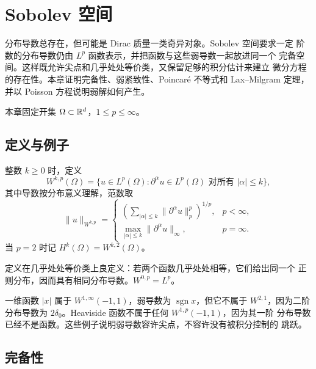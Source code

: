 \chapter{Sobolev 空间}
\label{chap:sobolev-spaces}

分布导数总存在，但可能是 Dirac 质量一类奇异对象。Sobolev 空间要求一定
阶数的分布导数仍由 \(L^p\) 函数表示，并把函数与这些弱导数一起放进同一个
完备空间。这样既允许尖点和几乎处处等价类，又保留足够的积分估计来建立
微分方程的存在性。本章证明完备性、弱紧致性、Poincaré 不等式和
Lax--Milgram 定理，并以 Poisson 方程说明弱解如何产生。

本章固定开集 \(\Omega\subset\mathbb{R}^d\)，\(1\le p\le\infty\)。

\section{定义与例子}

\begin{definition}
整数 \(k\ge0\) 时，定义
\[
 W^{k,p}(\Omega)=
 \{u\in L^p(\Omega):\partial^\alpha u\in L^p(\Omega)
 \text{ 对所有 }|\alpha|\le k\},
\]
其中导数按分布意义理解，范数取
\[
 \|u\|_{W^{k,p}}=
 \begin{cases}
 \left(\displaystyle\sum_{|\alpha|\le k}
 \|\partial^\alpha u\|_p^p\right)^{1/p},&p<\infty,\\[1ex]
 \displaystyle\max_{|\alpha|\le k}\|\partial^\alpha u\|_\infty,&p=\infty.
 \end{cases}
\]
当 \(p=2\) 时记 \(H^k(\Omega)=W^{k,2}(\Omega)\)。
\end{definition}

定义在几乎处处等价类上良定义：若两个函数几乎处处相等，它们给出同一个
正则分布，因而具有相同分布导数。\(W^{0,p}=L^p\)。

一维函数 \(|x|\) 属于 \(W^{1,\infty}(-1,1)\)，弱导数为
\(\operatorname{sgn}x\)，但它不属于 \(W^{2,1}\)，因为二阶分布导数为
\(2\delta_0\)。Heaviside 函数不属于任何 \(W^{1,p}(-1,1)\)，因为其一阶
分布导数已经不是函数。这些例子说明弱导数容许尖点，不容许没有被积分控制的
跳跃。

\section{完备性}

